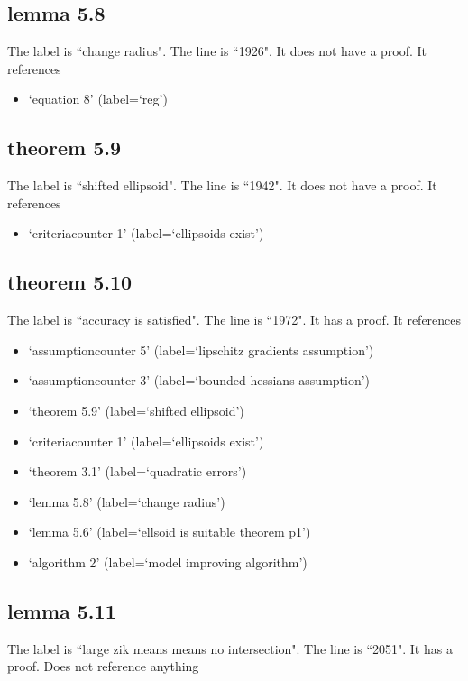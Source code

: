 \documentclass{article}
\begin{document}
\subsection{lemma 5.8}
The label is ``change radius".
The line is ``1926".
It does not have a proof.
It references \begin{itemize}
\item `equation 8' (label=`reg')
\end{itemize}
\subsection{theorem 5.9}
The label is ``shifted ellipsoid".
The line is ``1942".
It does not have a proof.
It references \begin{itemize}
\item `criteriacounter 1' (label=`ellipsoids exist')
\end{itemize}
\subsection{theorem 5.10}
The label is ``accuracy is satisfied".
The line is ``1972".
It has a proof.
It references \begin{itemize}
\item `assumptioncounter 5' (label=`lipschitz gradients assumption')
\item `assumptioncounter 3' (label=`bounded hessians assumption')
\item `theorem 5.9' (label=`shifted ellipsoid')
\item `criteriacounter 1' (label=`ellipsoids exist')
\item `theorem 3.1' (label=`quadratic errors')
\item `lemma 5.8' (label=`change radius')
\item `lemma 5.6' (label=`ellsoid is suitable theorem p1')
\item `algorithm 2' (label=`model improving algorithm')
\end{itemize}
\subsection{lemma 5.11}
The label is ``large zik means means no intersection".
The line is ``2051".
It has a proof.
Does not reference anything
\end{document}
